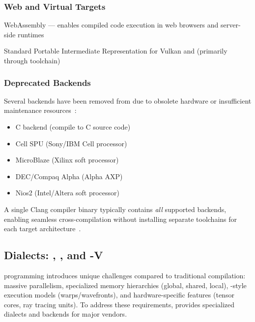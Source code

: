 \subsubsection*{Web and Virtual Targets}

\begin{description}[leftmargin=3.5cm,labelwidth=3cm,style=nextline]
  \item[\textbf{\acr{WASM}}] WebAssembly --- enables compiled code execution in web browsers and server-side  runtimes
  \item[\textbf{\acr{SPIR}-V}] Standard Portable Intermediate Representation for Vulkan and  (primarily through  toolchain)
\end{description}

\subsubsection*{Deprecated Backends}

Several backends have been removed from  due to obsolete hardware or insufficient maintenance resources~\cite{llvmwikipedia}:

\begin{itemize}[noitemsep]
  \item C backend (compile   to C source code)
  \item Cell SPU (Sony/IBM Cell processor)
  \item MicroBlaze (Xilinx soft processor)
  \item DEC/Compaq Alpha (Alpha AXP)
  \item Nios2 (Intel/Altera soft processor)
\end{itemize}

A single Clang compiler binary typically contains \textit{all} supported backends, enabling seamless cross-compilation without installing separate toolchains for each target architecture~\cite{llvmwikipedia}.

\subsection{ Dialects: , , and -V}

 programming introduces unique challenges compared to traditional  compilation: massive parallelism, specialized memory hierarchies (global, shared, local), -style execution models (warps/wavefronts), and hardware-specific features (tensor cores, ray tracing units). To address these requirements,  provides specialized dialects and backends for major  vendors.

